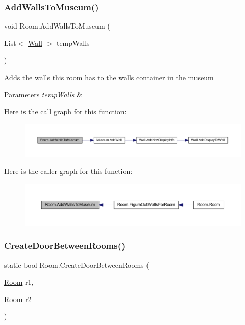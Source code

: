 \subsubsection{\texorpdfstring{Add\+Walls\+To\+Museum()}{AddWallsToMuseum()}}
{\footnotesize\ttfamily void Room.\+Add\+Walls\+To\+Museum (\begin{DoxyParamCaption}\item[{List$<$ \mbox{\hyperlink{class_wall}{Wall}} $>$}]{temp\+Walls }\end{DoxyParamCaption})\hspace{0.3cm}{\ttfamily [private]}}



Adds the walls this room has to the walls container in the museum 


\begin{DoxyParams}{Parameters}
{\em temp\+Walls} & \\
\hline
\end{DoxyParams}
Here is the call graph for this function\+:\nopagebreak
\begin{figure}[H]
\begin{center}
\leavevmode
\includegraphics[width=350pt]{class_room_a710be7ee50b4dd0abb526e344543a513_cgraph}
\end{center}
\end{figure}
Here is the caller graph for this function\+:\nopagebreak
\begin{figure}[H]
\begin{center}
\leavevmode
\includegraphics[width=350pt]{class_room_a710be7ee50b4dd0abb526e344543a513_icgraph}
\end{center}
\end{figure}
\mbox{\label{class_room_a294bb89a25ac765eca25106ccb4d1955}} 
\subsubsection{\texorpdfstring{Create\+Door\+Between\+Rooms()}{CreateDoorBetweenRooms()}}
{\footnotesize\ttfamily static bool Room.\+Create\+Door\+Between\+Rooms (\begin{DoxyParamCaption}\item[{\mbox{\hyperlink{class_room}{Room}}}]{r1,  }\item[{\mbox{\hyperlink{class_room}{Room}}}]{r2 }\end{DoxyParamCaption})\hspace{0.3cm}{\ttfamily [static]}}



